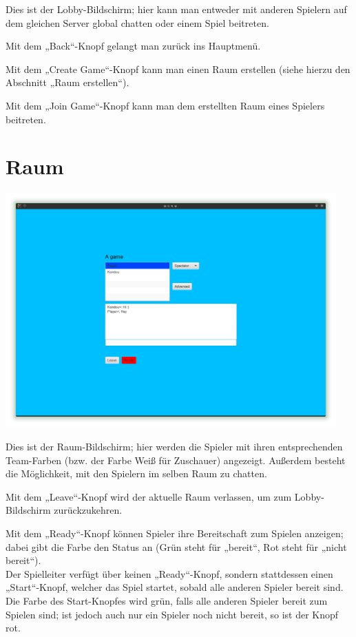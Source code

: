 \documentclass{scrreprt}
\begin{document}
Dies ist der Lobby-Bildschirm; hier kann man entweder mit anderen Spielern auf dem gleichen Server global chatten oder einem
Spiel beitreten.

Mit dem „Back“-Knopf gelangt man zurück ins Hauptmenü.

Mit dem „Create Game“-Knopf kann man einen Raum erstellen (siehe hierzu den Abschnitt „Raum erstellen“).

Mit dem „Join Game“-Knopf kann man dem erstellten Raum eines Spielers beitreten.

\section{Raum}

\includegraphics[height=9cm]{Screenshot10.png}

Dies ist der Raum-Bildschirm; hier werden die Spieler mit ihren entsprechenden Team-Farben (bzw. der Farbe Weiß für
Zuschauer) angezeigt. Außerdem besteht die Möglichkeit, mit den Spielern im selben Raum zu chatten.

Mit dem „Leave“-Knopf wird der aktuelle Raum verlassen, um zum Lobby-Bildschirm zurückzukehren.

Mit dem „Ready“-Knopf können Spieler ihre Bereitschaft zum Spielen anzeigen; dabei gibt die Farbe den Status an (Grün steht für „bereit“,
Rot steht für „nicht bereit“).\\
Der Spielleiter verfügt über keinen „Ready“-Knopf, sondern stattdessen einen „Start“-Knopf, welcher das Spiel startet, sobald alle anderen Spieler bereit sind. Die Farbe des Start-Knopfes wird grün, falls alle anderen Spieler bereit zum Spielen sind; ist jedoch auch nur ein Spieler noch nicht bereit, so ist der Knopf rot.
\end{document}
